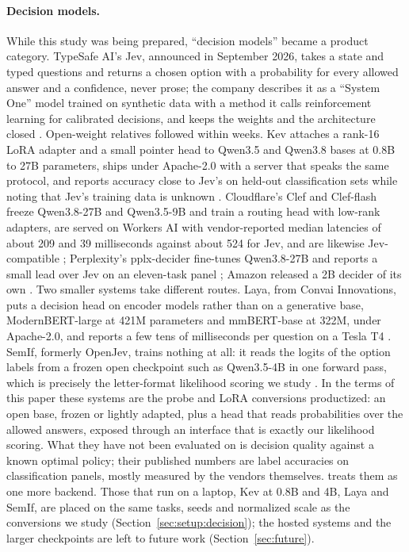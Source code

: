 \paragraph{Decision models.}
While this study was being prepared, ``decision models'' became a product category. TypeSafe AI's Jev, announced in September 2026, takes a state and typed questions and returns a chosen option with a probability for every allowed answer and a confidence, never prose; the company describes it as a ``System One'' model trained on synthetic data with a method it calls reinforcement learning for calibrated decisions, and keeps the weights and the architecture closed \citep{typesafe2026jev,typesafe2026systemone,typesafe2026choice,techcrunch2026jev}. Open-weight relatives followed within weeks. Kev attaches a rank-16 LoRA adapter and a small pointer head to Qwen3.5 and Qwen3.8 bases at 0.8B to 27B parameters, ships under Apache-2.0 with a server that speaks the same protocol, and reports accuracy close to Jev's on held-out classification sets while noting that Jev's training data is unknown \citep{palmer2026kev}. Cloudflare's Clef and Clef-flash freeze Qwen3.8-27B and Qwen3.5-9B and train a routing head with low-rank adapters, are served on Workers AI with vendor-reported median latencies of about 209 and 39 milliseconds against about 524 for Jev, and are likewise Jev-compatible \citep{cloudflare2026clef}; Perplexity's pplx-decider fine-tunes Qwen3.8-27B and reports a small lead over Jev on an eleven-task panel \citep{perplexity2026decider}; Amazon released a 2B decider of its own \citep{techcrunch2026decisionmodels,thenewstack2026jev}. Two smaller systems take different routes. Laya, from Convai Innovations, puts a decision head on encoder models rather than on a generative base, ModernBERT-large at 421M parameters and mmBERT-base at 322M, under Apache-2.0, and reports a few tens of milliseconds per question on a Tesla T4 \citep{convai2026laya}. SemIf, formerly OpenJev, trains nothing at all: it reads the logits of the option labels from a frozen open checkpoint such as Qwen3.5-4B in one forward pass, which is precisely the letter-format likelihood scoring we study \citep{lee2026semif}. In the terms of this paper these systems are the probe and LoRA conversions productized: an open base, frozen or lightly adapted, plus a head that reads probabilities over the allowed answers, exposed through an interface that is exactly our likelihood scoring. What they have not been evaluated on is decision quality against a known optimal policy; their published numbers are label accuracies on classification panels, mostly measured by the vendors themselves. \deadeye{} treats them as one more backend. Those that run on a laptop, Kev at 0.8B and 4B, Laya and SemIf, are placed on the same tasks, seeds and normalized scale as the conversions we study (Section~\ref{sec:setup:decision}); the hosted systems and the larger checkpoints are left to future work (Section~\ref{sec:future}).

